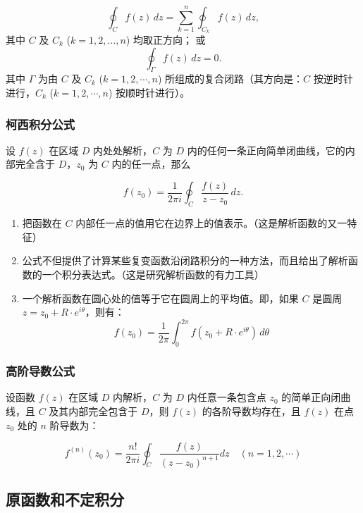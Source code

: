 \[
\oint_{C} f(z) \, dz = \sum_{k=1}^{n} \oint_{C_k} f(z) \, dz,
\]
其中 \(C\) 及 \(C_k\) (\(k = 1, 2, \ldots, n\)) 均取正方向； 或
\[
\oint_{\Gamma} f(z) \, dz = 0.
\]
其中 \(\Gamma\) 为由 \(C\) 及 \(C_k\) (\(k = 1, 2, \cdots, n\))
所组成的复合闭路（其方向是：\(C\) 按逆时针进行，\(C_k\)
(\(k = 1, 2, \cdots, n\)) 按顺时针进行）。
\subsubsection{柯西积分公式}
\label{柯西积分公式}
设 \(f(z)\) 在区域 \(D\) 内处处解析，\(C\) 为 \(D\)
内的任何一条正向简单闭曲线，它的内部完全含于 \(D\)，\(z_0\) 为 \(C\)
内的任一点，那么

\[
f(z_{0}) = \frac{1}{2\pi i} \oint_{C} \frac{f(z)}{z - z_{0}} \, dz.
\]

\begin{tcolorbox}[title={说明},colback=red!5!white
,colframe=red!75!black
,colbacktitle=yellow!50!red
,coltitle=red!25!black, fonttitle=\bfseries,subtitle style={boxrule=0.4pt, colback=yellow!50!red!25!white}]
\begin{enumerate}
\item 把函数在 \(C\) 内部任一点的值用它在边界上的值表示。（这是解析函数的又一特征）
\item 公式不但提供了计算某些复变函数沿闭路积分的一种方法，而且给出了解析函数的一个积分表达式。（这是研究解析函数的有力工具）
\item 一个解析函数在圆心处的值等于它在圆周上的平均值。即，如果 \(C\) 是圆周 \(z = z_{0} + R \cdot e^{i\theta}\)，则有：
$$
    f(z_{0}) = \frac{1}{2\pi} \int_{0}^{2\pi} f(z_{0} + R \cdot e^{i\theta}) \, d\theta
    $$
\end{enumerate}

\end{tcolorbox}
\subsubsection{高阶导数公式}
\label{高阶导数公式}
设函数 \(f(z)\) 在区域 \(D\) 内解析，\(C\) 为 \(D\) 内任意一条包含点 \(z_0\) 的简单正向闭曲线，且 \(C\) 及其内部完全包含于 \(D\)，则 \(f(z)\)
的各阶导数均存在，且 \(f(z)\) 在点 \(z_0\) 处的 \(n\) 阶导数为：

\[
f^{(n)}(z_0) = \frac{n!}{2\pi i} \oint_{C} \frac{f(z)}{(z - z_0)^{n+1}}  dz \quad (n = 1, 2, \cdots)
\]
\subsection{原函数和不定积分}
\label{原函数和不定积分}
